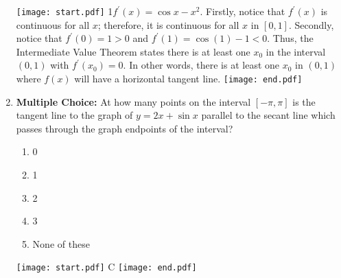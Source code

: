 \documentclass[12pt]{article}
\begin{document}
\begin{enumerate}
\texttt{[image: start.pdf]}
{{{1\linewidth}{$f^{\prime}(x)=\cos{x}-x^2$.  Firstly, notice that $f^{\prime}(x)$ is continuous for all $x$; therefore, it is continuous for all $x$ in $[0,1]$.  Secondly, notice that $f^{\prime}(0)=1>0$ and $f^{\prime}(1)=\cos{(1)}-1<0$.  Thus, the Intermediate Value Theorem states there is at least one $x_0$ in the interval $(0,1)$ with $f^{\prime}(x_0)=0$.  In other words, there is at least one $x_0$ in $(0,1)$ where $f(x)$ will have a horizontal tangent line.}}}
\texttt{[image: end.pdf]}


\item {\bf Multiple Choice:} At how many points on the interval $[-\pi,\pi]$ is the tangent line to the graph of $y=2x+\sin{x}$ parallel to the secant line which passes through the graph endpoints of the interval?

\begin{enumerate}

\item 0

\item 1

\item 2

\item 3

\item None of these

\end{enumerate}

\texttt{[image: start.pdf]}
{{C}}
\texttt{[image: end.pdf]}


\end{enumerate}
\end{document}
